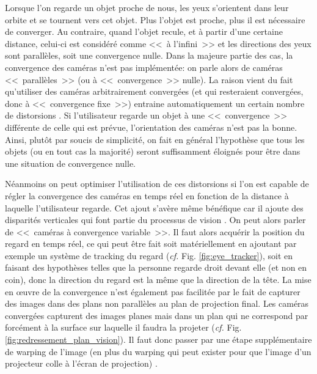 	\par Lorsque l'on regarde un objet proche de nous, les yeux s'orientent dans leur orbite et se tournent vers cet objet. Plus l'objet est proche, plus il est nécessaire de converger. Au contraire, quand l'objet recule, et à partir d'une certaine distance, celui-ci est considéré comme <<~à l'infini~>> et les directions des yeux sont parallèles, soit une convergence nulle. Dans la majeure partie des cas, la convergence des caméras n'est pas implémentée: on parle alors de caméras <<~parallèles~>> (ou à <<~convergence~>> nulle). La raison vient du fait qu'utiliser des caméras arbitrairement convergées (et qui resteraient convergées, donc à <<~convergence fixe~>>) entraine automatiquement un certain nombre de distorsions \citep{woods_image_1993}. Si l'utilisateur regarde un objet à une <<~convergence~>> différente de celle qui est prévue, l'orientation des caméras n'est pas la bonne. Ainsi, plutôt par soucis de simplicité, on fait en général l'hypothèse que tous les objets (ou en tout cas la majorité) seront suffisamment éloignés pour être dans une situation de convergence nulle.
	
	\par Néanmoins on peut optimiser l'utilisation de ces distorsions si l'on est capable de régler la convergence des caméras en temps réel en fonction de la distance à laquelle l'utilisateur regarde. Cet ajout s'avère même bénéfique car il ajoute des disparités verticales qui font partie du processus de vision \citep{aurat_immersion_2016}. On peut alors parler de <<~caméras à convergence variable~>>. Il faut alors acquérir la position du regard en temps réel, ce qui peut être fait soit matériellement en ajoutant par exemple un système de tracking du regard (\textit{cf.} Fig. \ref{fig:eye_tracker}), soit en faisant des hypothèses telles que la personne regarde droit devant elle (et non en coin), donc la direction du regard est la même que la direction de la tête. La mise en œuvre de la convergence n'est également pas facilitée par le fait de capturer des images dans des plans non parallèles au plan de projection final. Les caméras convergées capturent des images planes mais dans un plan qui ne correspond par forcément à la surface sur laquelle il faudra la projeter (\textit{cf.} Fig. \ref{fig:redressement_plan_vision}). Il faut donc passer par une étape supplémentaire de warping de l'image (en plus du warping qui peut exister pour que l'image d'un projecteur colle à l'écran de projection) \citep{aurat_immersion_2016}.
	
